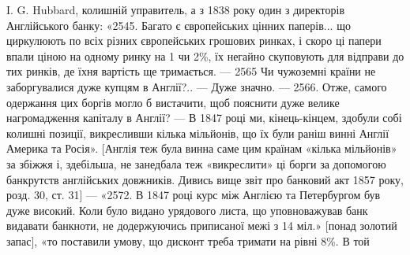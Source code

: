 I. G. Hubbard, колишній управитель, а з 1838 року один з директорів
Англійського банку: «2545. Багато є європейських цінних паперів... що циркулюють
по всіх різних європейських грошових ринках, і скоро ці папери впали
ціною на одному ринку на 1 чи 2\%, їх негайно скуповують для відправи до
тих ринків, де їхня вартість ще тримається. — 2565 Чи чужоземні країни не
заборгувалися дуже купцям в Англії?.. — Дуже значно. — 2566. Отже, самого
одержання цих боргів могло б вистачити, щоб пояснити дуже велике нагромадження
капіталу в Англії? — В 1847 році ми, кінець-кінцем, здобули собі колишні
позиції, викресливши кілька мільйонів, що їх були раніш винні Англії
Америка та Росія». [Англія теж була винна саме цим країнам «кілька мільйонів» за
збіжжя і, здебільша, не занедбала теж «викреслити» ці борги за допомогою
банкрутств англійських довжників. Дивись вище звіт про банковий акт 1857 року,
розд. 30, ст. 31] — «2572. В 1847 році курс між Англією та Петербургом був
дуже високий. Коли було видано урядового листа, що уповноважував банк видавати
банкноти, не додержуючись приписаної межі з 14 міл.» [понад золотий
запас], «то поставили умову, що дисконт треба тримати на рівні 8\%. В той
\parbreak{}  %
